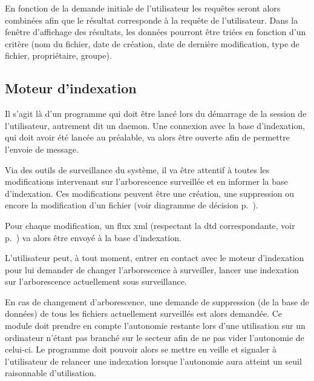 \documentclass[a4paper,12pt]{report}
\begin{document}
En fonction de la demande initiale de l'utilisateur les requêtes seront alors combinées afin que le résultat corresponde à la requête de l'utilisateur. Dans la fenêtre d'affichage des résultats, les données pourront être triées en fonction d'un critère (nom du \gls{fichier}, date de création, date de dernière modification, type de \gls{fichier}, propriétaire, groupe).

\subsection{Moteur d'indexation}
Il s'agit là d'un programme qui doit être lancé lors du démarrage de la session de l'utilisateur, autrement dit un \gls{daemon}. Une connexion avec la base d'indexation, qui doit avoir été lancée au préalable, va alors être ouverte afin de permettre l'envoie de message.

Via des outils de surveillance du système, il va être attentif à toutes les modifications intervenant sur l'\gls{arborescence} surveillée et en informer la base d'indexation. Ces modifications peuvent être une création, une suppression ou encore la modification d'un \gls{fichier} (voir diagramme de décision p.~\pageref{decision-daemon}).

Pour chaque modification, un flux \gls{xml} (respectant la \gls{dtd} correspondante, voir p.~\pageref{dtd_bi_mi}) va alors être envoyé à la base d'indexation.

L'utilisateur peut, à tout moment, entrer en contact avec le moteur d'indexation pour lui demander de changer l'\gls{arborescence} à surveiller, lancer une indexation sur l'\gls{arborescence} actuellement sous surveillance.

En cas de changement d'\gls{arborescence}, une demande de suppression (de la base de données) de tous les \glspl{fichier} actuellement surveillés est alors demandée.
Ce module doit prendre en compte l'autonomie restante lors d'une utilisation sur un ordinateur n'étant pas branché sur le secteur afin de ne pas vider l'autonomie de celui-ci. Le programme doit pouvoir alors se mettre en veille et signaler à l'utilisateur de relancer une indexation lorsque l'autonomie aura atteint un seuil raisonnable d'utilisation.
\end{document}
